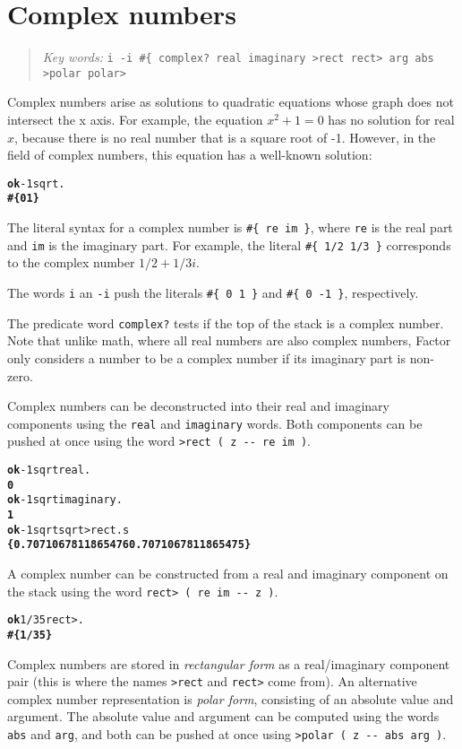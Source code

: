 \documentclass[english]{book}
\newcommand{\chapkeywords}[1]{{\parbox{10cm}{\begin{minipage}[b]{10cm}
\begin{quote}
\emph{Key words:} \texttt{#1}
\end{quote}
\end{minipage}}}}
\begin{document}
\section{Complex numbers}

\chapkeywords{i -i \#\{ complex?~real imaginary >rect rect> arg abs >polar polar>}

Complex numbers arise as solutions to quadratic equations whose graph does not intersect the x axis. For example, the equation $x^2 + 1 = 0$ has no solution for real $x$, because there is no real number that is a square root of -1. However, in the field of complex numbers, this equation has a well-known solution:

\begin{alltt}
\textbf{ok} -1 sqrt .
\textbf{\#\{ 0 1 \}}
\end{alltt}

The literal syntax for a complex number is \texttt{\#\{ re im \}}, where \texttt{re} is the real part and \texttt{im} is the imaginary part. For example, the literal \texttt{\#\{ 1/2 1/3 \}} corresponds to the complex number $1/2 + 1/3i$.

The words \texttt{i} an \texttt{-i} push the literals \texttt{\#\{ 0 1 \}} and \texttt{\#\{ 0 -1 \}}, respectively.

The predicate word \texttt{complex?} tests if the top of the stack is a complex number. Note that unlike math, where all real numbers are also complex numbers, Factor only considers a number to be a complex number if its imaginary part is non-zero.

Complex numbers can be deconstructed into their real and imaginary components using the \texttt{real} and \texttt{imaginary} words. Both components can be pushed at once using the word \texttt{>rect ( z -{}- re im )}.

\begin{alltt}
\textbf{ok} -1 sqrt real .
\textbf{0}
\textbf{ok} -1 sqrt imaginary .
\textbf{1}
\textbf{ok} -1 sqrt sqrt >rect .s
\textbf{\{ 0.7071067811865476 0.7071067811865475 \}}
\end{alltt}

A complex number can be constructed from a real and imaginary component on the stack using the word \texttt{rect> ( re im -{}- z )}.

\begin{alltt}
\textbf{ok} 1/3 5 rect> .
\textbf{\#\{ 1/3 5 \}}
\end{alltt}

Complex numbers are stored in \emph{rectangular form} as a real/imaginary component pair (this is where the names \texttt{>rect} and \texttt{rect>} come from). An alternative complex number representation is \emph{polar form}, consisting of an absolute value and argument. The absolute value and argument can be computed using the words \texttt{abs} and \texttt{arg}, and both can be pushed at once using \texttt{>polar ( z -{}- abs arg )}.
\end{document}
